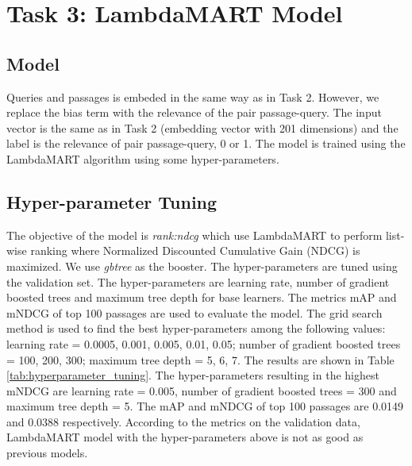 \section{Task 3: LambdaMART Model}
\subsection{Model}
Queries and passages is embeded in the same way as in Task 2. However, we replace the bias term with the relevance of the pair passage-query. The input vector is the same as in Task 2 (embedding vector with 201 dimensions) and the label is the relevance of pair passage-query, 0 or 1. The model is trained using the LambdaMART algorithm using some hyper-parameters.

\subsection{Hyper-parameter Tuning}
The objective of the model is \textsl{rank:ndcg} which use LambdaMART to perform list-wise ranking where Normalized Discounted Cumulative Gain (NDCG) is maximized. We use \textsl{gbtree} as the booster. The hyper-parameters are tuned using the validation set. The hyper-parameters are learning rate, number of gradient boosted trees and maximum tree depth for base learners. The metrics mAP and mNDCG of top 100 passages are used to evaluate the model. The grid search method is used to find the best hyper-parameters among the following values: learning rate = 0.0005, 0.001, 0.005, 0.01, 0.05; number of gradient boosted trees = 100, 200, 300; maximum tree depth = 5, 6, 7. The results are shown in Table \ref{tab:hyperparameter_tuning}. The hyper-parameters resulting in the highest mNDCG are learning rate = 0.005, number of gradient boosted trees = 300 and maximum tree depth = 5. The mAP and mNDCG of top 100 passages are 0.0149 and 0.0388 respectively. According to the metrics on the validation data, LambdaMART model with the hyper-parameters above is not as good as previous models.
